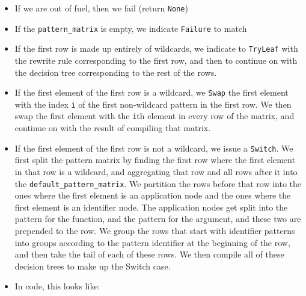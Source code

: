 \begin{itemize}
\begin{itemize}
\begin{itemize}
      \begin{itemize}
      \item
        If we are out of fuel, then we fail (return \texttt{None})
      \item
        If the \texttt{pattern\_matrix} is empty, we indicate
        \texttt{Failure} to match
      \item
        If the first row is made up entirely of wildcards, we indicate
        to \texttt{TryLeaf} with the rewrite rule corresponding to the
        first row, and then to continue on with the decision tree
        corresponding to the rest of the rows.
      \item
        If the first element of the first row is a wildcard, we
        \texttt{Swap} the first element with the index \texttt{i} of the
        first non-wildcard pattern in the first row. We then swap the
        first element with the \texttt{i}th element in every row of the
        matrix, and continue on with the result of compiling that
        matrix.
      \item
        If the first element of the first row is not a wildcard, we
        issue a \texttt{Switch}. We first split the pattern matrix by
        finding the first row where the first element in that row is a
        wildcard, and aggregating that row and all rows after it into
        the \texttt{default\_pattern\_matrix}. We partition the rows
        before that row into the ones where the first element is an
        application node and the ones where the first element is an
        identifier node. The application nodes get split into the
        pattern for the function, and the pattern for the argument, and
        these two are prepended to the row. We group the rows that start
        with identifier patterns into groups according to the pattern
        identifier at the beginning of the row, and then take the tail
        of each of these rows. We then compile all of these decision
        trees to make up the Switch case.
      \item
        In code, this looks like:


\end{itemize}
\end{itemize}
\end{itemize}
\end{itemize}
